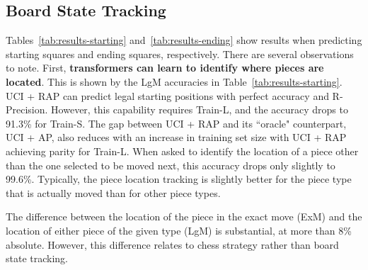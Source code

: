 \documentclass[12pt]{thesis-umich}[thesis]
\newcommand{\legalmove}{LgM\xspace}
\newcommand{\exactmove}{ExM\xspace}
\newcommand{\piecetype}{AP\xspace}
\begin{document}
\subsection{Board State Tracking}
\label{sec:state_tracking_res}
Tables~\ref{tab:results-starting} and~\ref{tab:results-ending} show results when predicting starting squares and ending squares, respectively. 
There are several observations to note. First,  \textbf{transformers can learn to identify where pieces are located}.
This is shown by the \legalmove accuracies in Table~\ref{tab:results-starting}.
UCI + RAP can predict legal starting positions with perfect accuracy and R-Precision. 
However, this capability requires Train-L, and the accuracy drops to 91.3\% for Train-S. 
The gap between UCI + RAP and its ``oracle" counterpart, UCI + \piecetype, also reduces with an increase in training set size with UCI + RAP achieving parity for Train-L.
When asked to identify the location of a piece other than the one selected to be moved next, this accuracy drops only slightly to 99.6\%. 
Typically, the piece location tracking is slightly better for the piece type that is actually moved 
than for other piece types.

The difference between the location of the piece in the exact move (\exactmove) and the location of either piece of the given type (\legalmove) is substantial, at more than 8\% absolute.  
However, this difference relates to chess strategy rather than board state tracking. 
\end{document}
